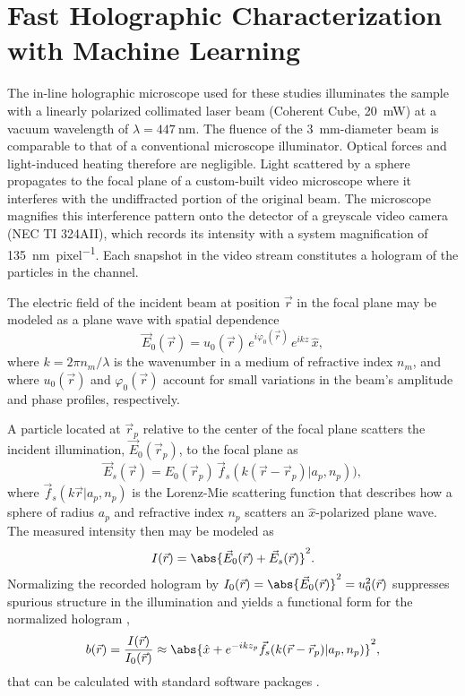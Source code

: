 \section{Fast Holographic Characterization with Machine Learning}

The in-line holographic microscope used for these studies
\cite{lee07,lee07a,krishnatreya14} 
illuminates the sample with a linearly polarized collimated
laser beam (Coherent Cube, \SI{20}{\mW})
at a vacuum wavelength of
$\lambda = \SI{447}{\nm}$.
The fluence of the \SI{3}{\mm}-diameter beam
is comparable to that of a conventional microscope illuminator.
Optical forces and light-induced heating therefore are negligible.
Light scattered by a sphere
propagates to the focal plane of a custom-built video microscope \cite{krishnatreya14}
where it interferes with the undiffracted portion of the original beam.
The microscope magnifies this interference pattern onto the detector of a greyscale
video camera (NEC TI 324AII), which records its intensity with a system
magnification of \SI{135}{\nm\per pixel}.
Each snapshot in the video stream constitutes a hologram of
the particles in the channel.

The electric field of the incident beam at position $\vec{r}$ in the focal plane
may be modeled as a plane wave with spatial dependence
\begin{equation}
  \label{eq:incidentfield}
  \vec{E}_0(\vec{r}) = u_0(\vec{r}) \, e^{i \varphi_0(\vec{r})} \, e^{i k z} \, \hat{x},
\end{equation}
where $k = 2 \pi n_m / \lambda$ is
the wavenumber in a medium of refractive index $n_m$, and
where $u_0(\vec{r})$ and $\varphi_0(\vec{r})$ account for small variations in the beam's
amplitude and phase profiles, respectively.

A particle located at $\vec{r}_p$ relative to the center of the focal
plane scatters the incident illumination,
$\vec{E}_0(\vec{r}_p)$, to the focal plane as
\begin{equation}
  \label{eq:scatteredfield}
  \vec{E}_s(\vec{r}) 
  = 
  E_0(\vec{r}_p) \, 
  \vec{f}_s\!\left( k (\vec{r} - \vec{r}_p) \vert a_p, n_p \right)),
\end{equation}
where $\vec{f}_s(k\vec{r} \vert a_p, n_p)$ is the Lorenz-Mie scattering function 
\cite{bohren83} that describes how a
sphere of radius $a_p$ and refractive index $n_p$ scatters an $\hat{x}$-polarized plane wave.
The measured
intensity then may be modeled as
\begin{equation}
  \label{eq:intensity}
  I(\vec{r}) 
  = 
  \abs{\vec{E}_0(\vec{r}) + \vec{E}_s(\vec{r})}^2.
\end{equation}
Normalizing the recorded hologram
by $I_0(\vec{r}) = \abs{\vec{E}_0(\vec{r})}^2 = u_0^2(\vec{r})$
suppresses spurious
structure in the illumination
and yields a functional form for the normalized hologram
\cite{lee07a,krishnatreya14},
\begin{equation}
  b(\vec{r}) 
  = \frac{I(\vec{r})}{I_0(\vec{r})}
  \approx
  \abs{
    \hat{x} + 
    e^{-i k z_p} \vec{f}_s(k(\vec{r} - \vec{r}_p)
    \vert a_p, n_p)}^2,
  \label{eq:theory}
\end{equation}
that can be calculated with standard software packages \cite{software}.

